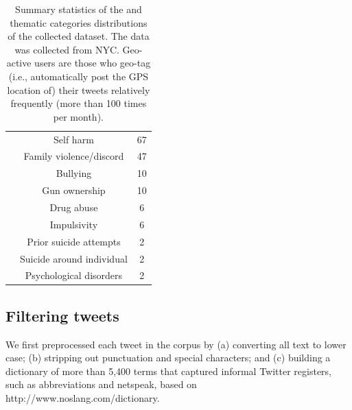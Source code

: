 \documentclass[11pt]{article}
\begin{document}
\begin{table}[h]
\begin{tabular}{|c|c|c|}
                                                                                    & Self harm                 & 67      \\ 
                                                                                    & Family violence/discord   & 47      \\ 
                                                                                    & Bullying                  & 10      \\ 
                                                                                    & Gun ownership             & 10 \\ 
                                                                                    & Drug abuse                & 6       \\ 
                                                                                    & Impulsivity               & 6       \\ 
                                                                                    & Prior suicide attempts    & 2       \\ 
                                                                                    & Suicide around individual & 2       \\ 
                                                                                    & Psychological disorders   & 2       \\ \hline 
                                                                                          
\end{tabular}
\caption {Summary statistics of the and thematic categories distributions of the collected dataset. The data was collected from NYC. Geo-active users are those who geo-tag (i.e., automatically post the GPS location of) their tweets relatively frequently (more than 100 times per month).} 
\label{table::dataset}
\end{table}

\subsection{Filtering tweets}

We first preprocessed each tweet in the corpus by (a) converting all text to lower case; (b) stripping out punctuation and special characters; and (c) building a dictionary of more than 5,400 terms that captured informal Twitter registers, such as abbreviations and netspeak, based on http://www.noslang.com/dictionary. 
\end{document}
